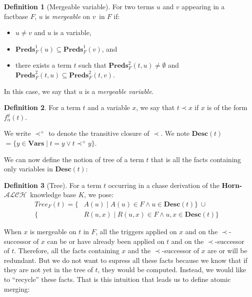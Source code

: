 \documentclass{article}
\theoremstyle{definition}
\newtheorem{definition}{Definition}[section]
\theoremstyle{remark}
\newcommand{\Vars}{\textbf{Vars}}
\newcommand{\Preds}{\textbf{Preds}}
\newcommand{\Tree}{\textit{Tree}}
\newcommand{\des}{\textbf{Desc}}
\newcommand{\ALCH}{\textbf{Horn-$\mathcal{ALCH}$}}
\begin{document}
\begin{definition}[Mergeable variable]
For two terms $u$ and $v$ appearing in a factbase $F$, $u$ is \emph{mergeable} on $v$\ in $F$ if:
\begin{itemize}
\item $u \neq v$ and $u$ is a variable,
\item $\Preds_{F}^1(u) \subseteq \Preds_{F}^1(v)$, and
\item there exists a term $t$ such that $\Preds^2_{F}(t,u) \neq \emptyset$ and $\Preds_{F}^2(t,u) \subseteq \Preds_{F}^2(t,v)$.
\end{itemize}
In this case, we say that $u$ is a \emph{mergeable variable}.
\end{definition}

\begin{definition}
For a term $t$ and a variable $x$, we say that $t \prec x$ if $x$ is of the form $f_\alpha^y(t)$.

We write $\prec^+$ to denote the transitive closure of $\prec$. We note \emph{$\des(t)$}$= \{y \in \Vars \mid t = y \vee t \prec^+ y\}$.
\end{definition}

We can now define the notion of tree of a term $t$ that is all the facts containing only variables in $\des(t)$:

\begin{definition}[Tree]
For a term $t$ occurring in a chase derivation of the \ALCH\ knowledge base $K$, we pose:
\begin{align*}
	\Tree_{F}(t) = \{&A(u) \mid A(u) \in F \wedge u \in \des(t)\}~\cup \\
	\{&R(u,x) \mid R(u,x) \in F \wedge u,x \in \des(t)\}
\end{align*}
\end{definition}

When $x$ is mergeable on $t$ in $F$, all the triggers applied on $x$ and on the $\prec$-successor of $x$ can be or have already been applied on $t$ and on the $\prec$-successor of $t$. Therefore, all the facts containing $x$ and the $\prec$-successor of $x$ are or will be redundant. But we do not want to supress all these facts because we know that if they are not yet in the tree of $t$, they would be computed. Instead, we would like to ``recycle'' these facts. That is this intuition that leads us to define atomic merging:
\end{document}
